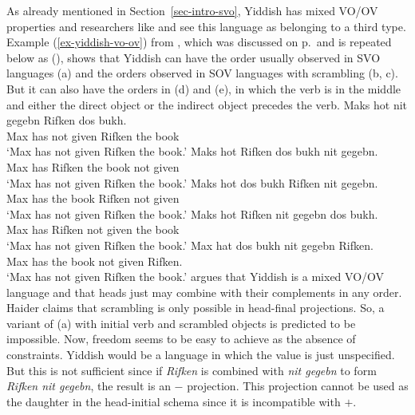 As already mentioned in Section~\ref{sec-intro-svo}, Yiddish has mixed VO/OV properties and
researchers like \parencites{Santorini93a-u}[]{Schallert2007a} and \cites[]{Haider2010a}{Haider2020a} see
this language as belonging to a third type. Example (\ref{ex-yiddish-vo-ov}) from \citet[]{Diesing97a}, which was discussed on p.\,\pageref{ex-yiddish-vo-ov} and is repeated
below as (), shows that Yiddish can have the order usually observed in SVO languages
(a) and the orders observed in SOV languages with scrambling (b, c). But it can also
have the orders in (d) and (e), in which the verb is in the middle and either the
direct object or the indirect object precedes the verb.
\eal
\ex
\gll Maks hot nit gegebn Rifken dos bukh.\\
     Max  has not given  Rifken the book\\\yiddish
\glt `Max has not given Rifken the book.' 
\ex 
\gll Maks hot Rifken dos bukh nit gegebn.\\
     Max  has Rifken the book not given\\
\glt `Max has not given Rifken the book.'
\ex
\gll Maks hot dos bukh Rifken nit gegebn.\\
     Max  has the book Rifken not given\\
\glt `Max has not given Rifken the book.'
\ex
\gll Maks hot Rifken nit gegebn dos bukh.\\
     Max  has Rifken not given  the book\\
\glt `Max has not given Rifken the book.'
\ex
\glt Max hat dos bukh nit gegebn Rifken.\\
     Max has the book not given  Rifken.\\
\glt `Max has not given Rifken the book.'
\zl
\citet[]{Haider2010a} argues that Yiddish is a mixed VO/OV language and that heads just may
combine with their complements in any order. Haider claims that scrambling is only possible in
head-final projections. So, a variant of (a) with initial verb and scrambled objects is
predicted to be impossible.
 Now,
freedom seems to be easy to achieve as the absence of constraints. Yiddish would be a language in
which the \initial value is just unspecified. But this is not sufficient since if \emph{Rifken} is
combined with \emph{nit gegebn} to form \emph{Rifken nit gegebn}, the result is an \initial $-$
projection. This projection cannot be used as the daughter in the head-initial schema since it is
incompatible with \initial $+$. 

